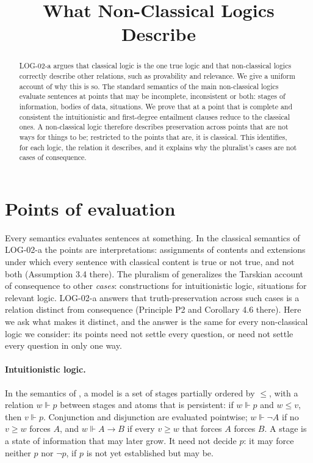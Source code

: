 \documentclass{situationist-preprint}
\title{What Non-Classical Logics Describe}
\begin{document}
\maketitle

\begin{abstract}
LOG-02-a argues that classical logic is the one true logic and that non-classical logics correctly describe other relations, such as provability and relevance. We give a uniform account of why this is so. The standard semantics of the main non-classical logics evaluate sentences at points that may be incomplete, inconsistent or both: stages of information, bodies of data, situations. We prove that at a point that is complete and consistent the intuitionistic and first-degree entailment clauses reduce to the classical ones. A non-classical logic therefore describes preservation across points that are not ways for things to be; restricted to the points that are, it is classical. This identifies, for each logic, the relation it describes, and it explains why the pluralist's cases are not cases of consequence.
\end{abstract}

\section{Points of evaluation}

Every semantics evaluates sentences at something. In the classical semantics of LOG-02-a the points are interpretations: assignments of contents and extensions under which every sentence with classical content is true or not true, and not both (Assumption 3.4 there). The pluralism of \citet{BeallRestall2006} generalizes the Tarskian account of consequence to other \emph{cases}: constructions for intuitionistic logic, situations for relevant logic. LOG-02-a answers that truth-preservation across such cases is a relation distinct from consequence (Principle P2 and Corollary 4.6 there). Here we ask what makes it distinct, and the answer is the same for every non-classical logic we consider: its points need not settle every question, or need not settle every question in only one way.

\paragraph{Intuitionistic logic.} In the semantics of \citet{Kripke1965}, a model is a set of stages partially ordered by $\leq$, with a relation $w \Vdash p$ between stages and atoms that is persistent: if $w \Vdash p$ and $w \leq v$, then $v \Vdash p$. Conjunction and disjunction are evaluated pointwise; $w \Vdash \neg A$ if no $v \geq w$ forces $A$, and $w \Vdash A \to B$ if every $v \geq w$ that forces $A$ forces $B$. A stage is a state of information that may later grow. It need not decide $p$: it may force neither $p$ nor $\neg p$, if $p$ is not yet established but may be.
\end{document}
